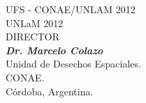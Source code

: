 \begin{titlepage}
\begin{center}
\newpage

\thispagestyle{empty}
\vspace*{1cm}
\textcopyright UFS - CONAE/UNLAM 2012\\
\textcopyright UNLaM 2012\\

\vspace*{5cm}
\normalsize DIRECTOR\\
\normalsize\textit{\textbf{Dr. Marcelo Colazo}}\\
Unidad de Desechos Espaciales.\\ CONAE.\\ Córdoba, Argentina.\\
\vspace*{3cm}


	
% 



\end{center}
\end{titlepage} 

\newpage
\thispagestyle{empty}
\mbox{}
